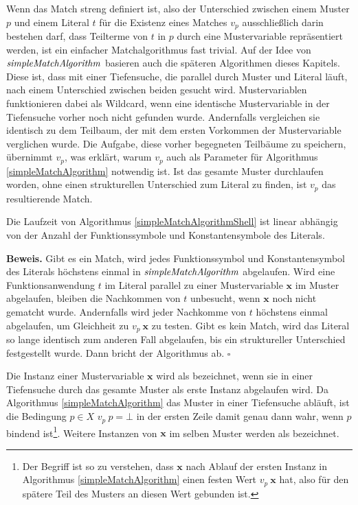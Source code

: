 Wenn das Match streng definiert ist, also der Unterschied zwischen einem Muster $p$ und einem Literal $t$ für die Existenz eines Matches $v_p$ ausschließlich darin bestehen darf, dass Teilterme von $t$ in $p$ durch eine Mustervariable repräsentiert werden, ist ein einfacher Matchalgorithmus fast trivial. Auf der Idee von $\mathit{simpleMatchAlgorithm}$ basieren auch die späteren Algorithmen dieses Kapitels. Diese ist, dass mit einer Tiefensuche, die parallel durch Muster und Literal läuft, nach einem Unterschied zwischen beiden gesucht wird. Mustervariablen funktionieren dabei als Wildcard, wenn eine identische Mustervariable in der Tiefensuche vorher noch nicht gefunden wurde. Andernfalls vergleichen sie identisch zu dem Teilbaum, der mit dem ersten Vorkommen der Mustervariable verglichen wurde. Die Aufgabe, diese vorher begegneten Teilbäume zu speichern, übernimmt $v_p$, was erklärt, warum $v_p$ auch als Parameter für Algorithmus \ref{simpleMatchAlgorithm} notwendig ist. Ist das gesamte Muster durchlaufen worden, ohne einen strukturellen Unterschied zum Literal zu finden, ist $v_p$ das resultierende Match.\\

\begin{lemma}
Die Laufzeit von Algorithmus \ref{simpleMatchAlgorithmShell} ist linear abhängig von der Anzahl der Funktionssymbole und Konstantensymbole des Literals.
\end{lemma}

\textbf{Beweis.}
Gibt es ein Match, wird jedes Funktionssymbol und Konstantensymbol des Literals höchstens einmal in $\mathit{simpleMatchAlgorithm}$ abgelaufen. Wird eine Funktionsanwendung $t$ im Literal parallel zu einer Mustervariable $\mathbf x$ im Muster abgelaufen, bleiben die Nachkommen von $t$ unbesucht, wenn $\mathbf x$ noch nicht gematcht wurde. Andernfalls wird jeder Nachkomme von $t$ höchstens einmal abgelaufen, um Gleichheit zu $v_p~\mathbf x$ zu testen.
Gibt es kein Match, wird das Literal so lange identisch zum anderen Fall abgelaufen, bis ein struktureller Unterschied festgestellt wurde. Dann bricht der Algorithmus ab.
\hfill $\square$\\


\begin{definition}
Die Instanz einer Mustervariable $\mathbf x$ wird als   bezeichnet, wenn sie in einer Tiefensuche durch das gesamte Muster als erste Instanz abgelaufen wird. Da Algorithmus \ref{simpleMatchAlgorithm} das Muster in einer Tiefensuche abläuft, ist die Bedingung $p \in X$ \KwAnd $v_p~p = \bot$ in der ersten Zeile damit genau dann wahr, wenn $p$ bindend ist\footnote{Der Begriff  ist so zu verstehen, dass $\mathbf x$ nach Ablauf der ersten Instanz in Algorithmus \ref{simpleMatchAlgorithm} einen festen Wert $v_p~\mathbf x$ hat, also für den spätere Teil des Musters an diesen Wert gebunden ist.}. Weitere Instanzen von $\mathbf x$ im selben Muster werden als  bezeichnet.
\end{definition}


